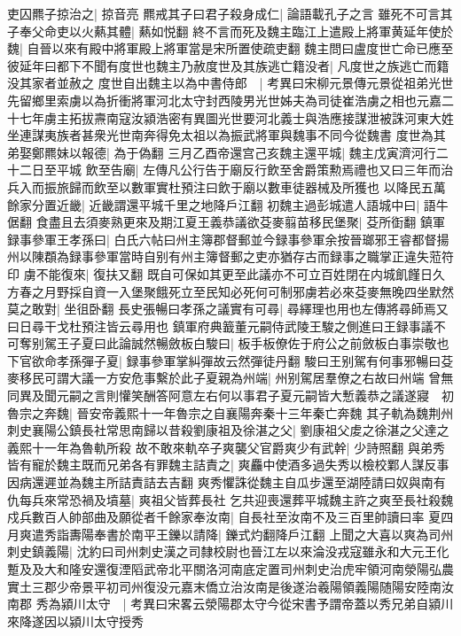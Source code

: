 吏囚羆子掠治之|{
	掠音亮}
羆戒其子曰君子殺身成仁|{
	論語載孔子之言}
雖死不可言其子奉父命吏以火爇其體|{
	爇如悦翻}
終不言而死及魏主臨江上遣殿上將軍黄延年使於魏|{
	自晉以來有殿中將軍殿上將軍當是宋所置使疏吏翻}
魏主問曰盧度世亡命已應至彼延年曰都下不聞有度世也魏主乃赦度世及其族逃亡籍没者|{
	凡度世之族逃亡而籍没其家者並赦之}
度世自出魏主以為中書侍郎　|{
	考異曰宋柳元景傳元景從祖弟光世先留鄉里索虜以為折衝將軍河北太守封西陵男光世姊夫為司徒崔浩虜之相也元嘉二十七年虜主拓拔燾南寇汝潁浩密有異圖光世要河北義士與浩應接謀泄被誅河東大姓坐連謀夷族者甚衆光世南奔得免太祖以為振武將軍與魏事不同今從魏書}
度世為其弟娶鄭羆妹以報德|{
	為于偽翻}
三月乙酉帝還宫己亥魏主還平城|{
	魏主戊寅濟河行二十二日至平城}
飲至告廟|{
	左傳凡公行告于廟反行飲至舍爵策勲焉禮也又曰三年而治兵入而振旅歸而飲至以數軍實杜預注曰飲于廟以數車徒器械及所獲也}
以降民五萬餘家分置近畿|{
	近畿謂還平城千里之地降戶江翻}
初魏主過彭城遣人語城中曰|{
	語牛倨翻}
食盡且去須麥熟更來及期江夏王義恭議欲芟麥翦苗移民堡聚|{
	芟所衘翻}
鎮軍録事參軍王孝孫曰|{
	白氏六帖曰州主簿郡督郵並今録事參軍余按晉瑯邪王睿都督揚州以陳頵為録事參軍當時自别有州主簿督郵之吏亦猶存古而録事之職掌正違失蒞符印}
虜不能復來|{
	復扶又翻}
既自可保如其更至此議亦不可立百姓閉在内城飢饉日久方春之月野採自資一入堡聚餓死立至民知必死何可制邪虜若必來芟麥無晚四坐默然莫之敢對|{
	坐徂卧翻}
長史張暢曰孝孫之議實有可尋|{
	尋繹理也用也左傳將尋師焉又曰日尋干戈杜預注皆云尋用也}
鎮軍府典籖董元嗣侍武陵王駿之側進曰王録事議不可奪别駕王子夏曰此論誠然暢斂板白駿曰|{
	板手板僚佐于府公之前斂板白事崇敬也}
下官欲命孝孫彈子夏|{
	録事參軍掌糾彈故云然彈徒丹翻}
駿曰王别駕有何事邪暢曰芟麥移民可謂大議一方安危事繫於此子夏親為州端|{
	州别駕居羣僚之右故曰州端}
曾無同異及聞元嗣之言則懽笑酬答阿意左右何以事君子夏元嗣皆大慙義恭之議遂寢　初魯宗之奔魏|{
	晉安帝義熙十一年魯宗之自襄陽奔秦十三年秦亡奔魏}
其子軌為魏荆州刺史襄陽公鎮長社常思南歸以昔殺劉康祖及徐湛之父|{
	劉康祖父䖍之徐湛之父達之義熙十一年為魯軌所殺}
故不敢來軌卒子爽襲父官爵爽少有武幹|{
	少詩照翻}
與弟秀皆有寵於魏主既而兄弟各有罪魏主詰責之|{
	爽麤中使酒多過失秀以檢校鄴人謀反事因病還遲並為魏主所詰責詰去吉翻}
爽秀懼誅從魏主自瓜步還至湖陸請曰奴與南有仇每兵來常恐禍及墳墓|{
	爽祖父皆葬長社}
乞共迎喪還葬平城魏主許之爽至長社殺魏戍兵數百人帥部曲及願從者千餘家奉汝南|{
	自長社至汝南不及三百里帥讀曰率}
夏四月爽遣秀詣夀陽奉書於南平王鑠以請降|{
	鑠式灼翻降戶江翻}
上聞之大喜以爽為司州刺史鎮義陽|{
	沈約曰司州刺史漢之司隸校尉也晉江左以來淪没戎寇雖永和大元王化蹔及及大和隆安還復湮䧟武帝北平關洛河南底定置司州刺史治虎牢領河南滎陽弘農實土三郡少帝景平初司州復没元嘉末僑立治汝南是後遂治羲陽領義陽随陽安陸南汝南郡}
秀為潁川太守　|{
	考異曰宋畧云滎陽郡太守今從宋書予謂帝蓋以秀兄弟自潁川來降遂因以潁川太守授秀}
